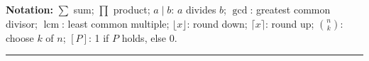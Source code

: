 \par\vspace{3pt}
\textbf{Notation:} $\sum$ sum; $\prod$ product; $a\mid b$: $a$ divides $b$; $\gcd$: greatest common divisor; $\operatorname{lcm}$: least common multiple; $\lfloor x\rfloor$: round down; $\lceil x\rceil$: round up; $\binom nk$: choose $k$ of $n$; $[P]$: 1 if $P$ holds, else 0.
\par\vspace{2pt}\hrule\vspace{2pt}
\endgroup
